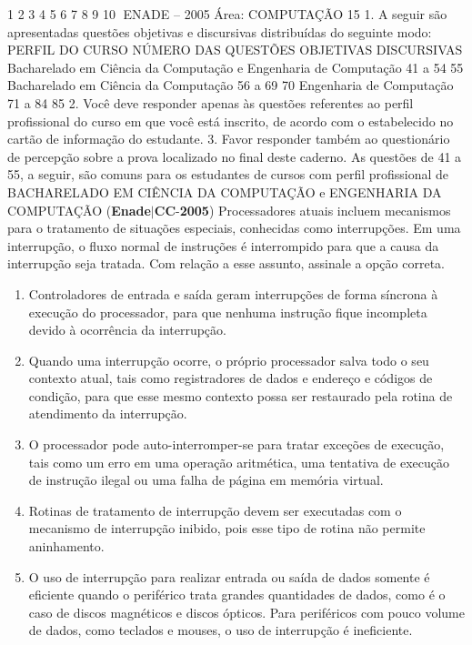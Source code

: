 \documentclass{exam}
\begin{document}
\begin{questions}
1
2
3
4
5
6
7
8
9
10
ENADE – 2005 Área: COMPUTAÇÃO 15
1. A seguir são apresentadas questões objetivas e discursivas distribuídas do seguinte modo:
PERFIL DO CURSO
NÚMERO DAS QUESTÕES
OBJETIVAS DISCURSIVAS
Bacharelado em Ciência da Computação e
Engenharia de Computação
41 a 54 55
Bacharelado em Ciência da Computação 56 a 69 70
Engenharia de Computação 71 a 84 85
2. Você deve responder apenas às questões referentes ao perfil profissional do curso em que
você está inscrito, de acordo com o estabelecido no cartão de informação do estudante.
3. Favor responder também ao questionário de percepção sobre a prova localizado no final
deste caderno.
As questões de 41 a 55, a seguir, são comuns para os estudantes de cursos com perfil profissional de
BACHARELADO EM CIÊNCIA DA COMPUTAÇÃO e ENGENHARIA DA COMPUTAÇÃO
\question (\textbf{Enade}$|$\textbf{CC}-\textbf{2005}) Processadores atuais incluem mecanismos para o tratamento
de situações especiais, conhecidas como interrupções. Em uma
interrupção, o fluxo normal de instruções é interrompido para
que a causa da interrupção seja tratada. Com relação a esse
assunto, assinale a opção correta.
	\begin{enumerate}[label=\alph*)]
		\item  Controladores de entrada e saída geram interrupções de
forma síncrona à execução do processador, para que
nenhuma instrução fique incompleta devido à ocorrência
da interrupção.
		\item  Quando uma interrupção ocorre, o próprio processador
salva todo o seu contexto atual, tais como registradores de
dados e endereço e códigos de condição, para que esse
mesmo contexto possa ser restaurado pela rotina de
atendimento da interrupção.
		\item  O processador pode auto-interromper-se para tratar
exceções de execução, tais como um erro em uma
operação aritmética, uma tentativa de execução de
instrução ilegal ou uma falha de página em memória
virtual.
		\item  Rotinas de tratamento de interrupção devem ser executadas
com o mecanismo de interrupção inibido, pois esse tipo de
rotina não permite aninhamento.
		\item  O uso de interrupção para realizar entrada ou saída de
dados somente é eficiente quando o periférico trata
grandes quantidades de dados, como é o caso de discos
magnéticos e discos ópticos. Para periféricos com pouco
volume de dados, como teclados e mouses, o uso de
interrupção é ineficiente.

	\end{enumerate}


\end{questions}
\end{document}
